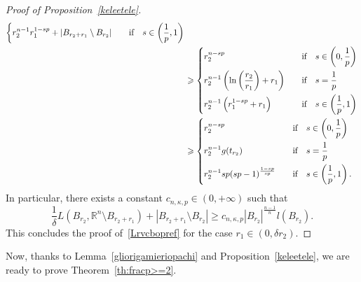 \documentclass[12pt]{article}
\newcommand{\R}{\mathbb{R}}
\numberwithin{equation}{section}
\renewcommand{\geq}{\geqslant}
\begin{document}
\begin{proof}[Proof of Proposition~\ref{keleetele}]
\begin{equation}
\begin{split}
\begin{dcases}
r_2^{n-1} r_1^{1-sp}+\left|B_{r_2+r_1}\setminus B_{r_2}\right|\quad &\mbox{if}\quad s\in \left(\frac{1}{p},1\right)
\end{dcases}\\
&\geq \begin{dcases}
r_2^{n-sp} \quad &\mbox{if}\quad s\in \left(0,\frac{1}{p}\right)\\
r_2^{n-1}\left(\ln\left(\frac{r_2}{r_1}\right)+  r_1\right) \quad &\mbox{if}\quad s=\frac{1}{p}\\
r_2^{n-1} \left(r_1^{1-sp}+r_1\right) \quad &\mbox{if}\quad s\in \left(\frac{1}{p},1\right)
\end{dcases}\\
&\geq \begin{dcases}
r_2^{n-sp} \quad &\mbox{if}\quad s\in \left(0,\frac{1}{p}\right)\\
r_2^{n-1}g(t_{r_2}) \quad &\mbox{if}\quad s=\frac{1}{p}\\
r_2^{n-1} sp(sp-1)^{\frac{1-sp}{sp}} \quad &\mbox{if}\quad s\in \left(\frac{1}{p},1\right).
\end{dcases}\\
\end{split}
\end{equation}
In particular, there exists a constant $c_{n,\kappa,p}\in (0,+\infty)$ such  that 
\begin{equation*}
\frac{1}{\delta}L(B_{r_2},\R^n\setminus B_{r_2+r_1})+\left|B_{r_2+r_1}\setminus B_{r_2}\right|\geq c_{n,\kappa,p}\left|B_{r_2}\right|^{\frac{n-1}{n}}l(B_{r_2}).
\end{equation*}  
This concludes the proof of~\eqref{Lrvcbopref} for the case $r_1\in (0,\delta r_2)$. 
\end{proof}


Now, thanks to Lemma~\ref{gliorigamieriopachi} and Proposition~\ref{keleetele}, we are ready to prove Theorem~\ref{th:fracp>=2}. 
\end{document}
